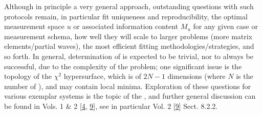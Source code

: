 \documentclass[letterpaper,table,10pt,english]{jupyterBook}
\begin{document}
\sphinxAtStartPar
Although in principle a very general approach, outstanding questions with such protocols remain, in particular fit uniqueness and reproducibility, the optimal measurement space \(u\) \sphinxhyphen{} or associated information content \(M_u\) \sphinxhyphen{} for any given case or measurement schema, how well they will scale to larger problems (more matrix elements/partial waves), the most efficient fitting methodologies/strategies, and so forth. In general, determination of {\hyperref[\detokenize{backmatter/glossary:term-radial-matrix-elements}]{}} is  expected to be trivial, nor to always be successful, due to the complexity of the problem; one significant issue is the topology of the \(\chi^2\) hypersurface, which is of \(2N-1\) dimensions (where \(N\) is the number of {\hyperref[\detokenize{backmatter/glossary:term-radial-matrix-elements}]{}}), and may contain local minima. Exploration of these questions for various exemplar systems is the topic of the {\hyperref[\detokenize{part2/extracting_matrix_elements_overview_270423:chpt-extracting-matrix-elements-overview}]{}}, and further general discussion can be found in  Vols. 1 \& 2 {[}\hyperlink{cite.backmatter/bibliography:id677}{4}, \hyperlink{cite.backmatter/bibliography:id678}{9}{]}, see in particular  Vol. 2 {[}\hyperlink{cite.backmatter/bibliography:id678}{9}{]} Sect. 8.2.2.
\end{document}
